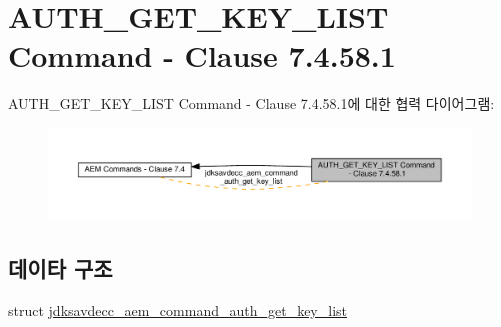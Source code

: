 \hypertarget{group__command__auth__get__key__list}{}\section{A\+U\+T\+H\+\_\+\+G\+E\+T\+\_\+\+K\+E\+Y\+\_\+\+L\+I\+ST Command -\/ Clause 7.4.58.1}
\label{group__command__auth__get__key__list}
A\+U\+T\+H\+\_\+\+G\+E\+T\+\_\+\+K\+E\+Y\+\_\+\+L\+I\+ST Command -\/ Clause 7.4.58.1에 대한 협력 다이어그램\+:
\nopagebreak
\begin{figure}[H]
\begin{center}
\leavevmode
\includegraphics[width=350pt]{group__command__auth__get__key__list}
\end{center}
\end{figure}
\subsection*{데이타 구조}
\begin{DoxyCompactItemize}
\item 
struct \hyperlink{structjdksavdecc__aem__command__auth__get__key__list}{jdksavdecc\+\_\+aem\+\_\+command\+\_\+auth\+\_\+get\+\_\+key\+\_\+list}
\end{DoxyCompactItemize}
